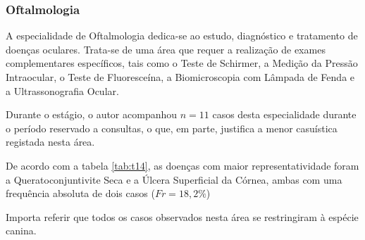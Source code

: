 \subsubsection{Oftalmologia}

A especialidade de Oftalmologia dedica-se ao estudo, diagnóstico e tratamento de doenças oculares. Trata-se de uma área que requer a realização de exames complementares específicos, tais como o Teste de Schirmer, a Medição da Pressão Intraocular, o Teste de Fluoresceína, a Biomicroscopia com Lâmpada de Fenda e a Ultrassonografia Ocular.

Durante o estágio, o autor acompanhou $n=11$ casos desta especialidade durante o período reservado a consultas, o que, em parte, justifica a menor casuística registada nesta área.

De acordo com a tabela \ref{tab:t14}, as doenças com maior representatividade foram a Queratoconjuntivite Seca e a Úlcera Superficial da Córnea, ambas com uma frequência absoluta de dois casos ($Fr=18,2\%$)

Importa referir que todos os casos observados nesta área se restringiram à espécie canina.

